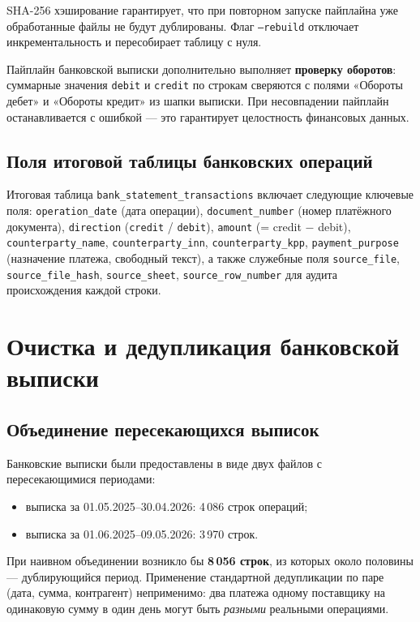 SHA-256 хэширование гарантирует, что при повторном запуске пайплайна уже обработанные файлы не будут дублированы. Флаг \texttt{--rebuild} отключает инкрементальность и пересобирает таблицу с нуля.

Пайплайн банковской выписки дополнительно выполняет \textbf{проверку оборотов}: суммарные значения \texttt{debit} и \texttt{credit} по строкам сверяются с полями «Обороты дебет» и «Обороты кредит» из шапки выписки. При несовпадении пайплайн останавливается с ошибкой --- это гарантирует целостность финансовых данных.

\subsection{Поля итоговой таблицы банковских операций}

Итоговая таблица \texttt{bank\_statement\_transactions} включает следующие ключевые поля: \texttt{operation\_date} (дата операции), \texttt{document\_number} (номер платёжного документа), \texttt{direction} (\texttt{credit} / \texttt{debit}), \texttt{amount} (= credit $-$ debit), \texttt{counterparty\_name}, \texttt{counterparty\_inn}, \texttt{counterparty\_kpp}, \texttt{payment\_purpose} (назначение платежа, свободный текст), а также служебные поля \texttt{source\_file}, \texttt{source\_file\_hash}, \texttt{source\_sheet}, \texttt{source\_row\_number} для аудита происхождения каждой строки.

\section{Очистка и дедупликация банковской выписки}

\subsection{Объединение пересекающихся выписок}

Банковские выписки были предоставлены в виде двух файлов с пересекающимися периодами:
\begin{itemize}
  \item выписка за 01.05.2025--30.04.2026: 4\,086 строк операций;
  \item выписка за 01.06.2025--09.05.2026: 3\,970 строк.
\end{itemize}

При наивном объединении возникло бы \textbf{8\,056 строк}, из которых около половины --- дублирующийся период. Применение стандартной дедупликации по паре (дата, сумма, контрагент) неприменимо: два платежа одному поставщику на одинаковую сумму в один день могут быть \textit{разными} реальными операциями.

